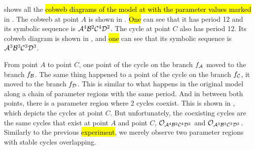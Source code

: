  shows all the \hl{cobweb diagrams of the model at with the parameter values marked} in .
The cobweb at point $A$ is shown in .
\hl{One} can see that it has period 12 and its symbolic sequence is $\mathcal{A}^4\mathcal{B}^2\mathcal{C}^4\mathcal{D}^2$.
The cycle at point $C$ also has period 12.
Its cobweb diagram is shown in , and \hl{one} can see that its symbolic sequence is $\mathcal{A}^3\mathcal{B}^3\mathcal{C}^3\mathcal{D}^3$.

From point $A$ to point $C$, one point of the cycle on the branch $f_{\mathcal{A}}$ moved to the branch $f_{\mathcal{B}}$.
The same thing happened to a point of the cycle on the branch $f_{\mathcal{C}}$, it moved to the branch $f_{\mathcal{D}}$.
This is similar to what happens in the original model along a chain of parameter regions with the same period.
And in between both points, there is a parameter region where 2 cycles coexist.
This is shown in , which depicts the cycles at point $C$.
But unfortunately, the coexisting cycles are the same cycles that exist at point $A$ and point $C$, $\mathcal{O}_{\mathcal{A}^4\mathcal{B}^2\mathcal{C}^4\mathcal{D}^2}$ and $\mathcal{O}_{\mathcal{A}^3\mathcal{B}^3\mathcal{C}^3\mathcal{D}^3}$.
Similarly to the previous \hl{experiment}, we merely observe two parameter regions with stable cycles overlapping.
